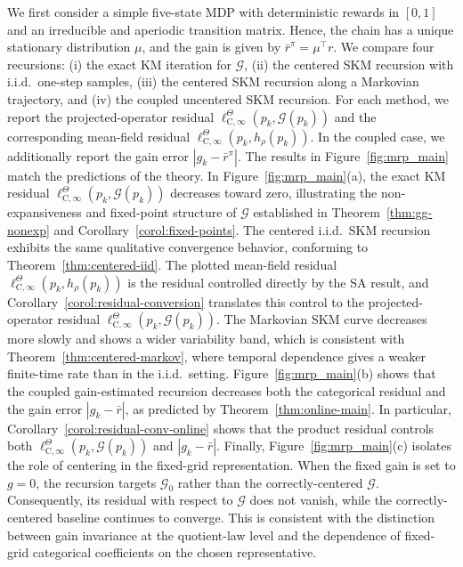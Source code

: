 \documentclass{article}
\begin{document}
We first consider a simple five-state MDP with deterministic rewards in $[0,1]$ and an irreducible and aperiodic transition matrix. Hence, the chain has a unique stationary distribution $\mu$, and the gain is given by $\bar r^\pi=\mu^\top r$. We compare four recursions: (i) the exact KM iteration for $\mathcal G$, (ii) the centered SKM recursion with i.i.d.\ one-step samples, (iii) the centered SKM recursion along a Markovian trajectory, and (iv) the coupled uncentered SKM recursion. For each method, we report the projected-operator residual $\ell^\Theta_{\mathrm C, \infty}(p_k,\mathcal G(p_k))$ and the corresponding mean-field residual $\ell^\Theta_{\mathrm C, \infty}(p_k,h_\rho(p_k))$. In the coupled case, we additionally report the gain error $|g_k-\bar r^\pi|$. The results in Figure~\ref{fig:mrp_main} match the predictions of the theory. In Figure~\ref{fig:mrp_main}(a), the exact KM residual $\ell^\Theta_{\mathrm C, \infty}(p_k,\mathcal G(p_k))$ decreases toward zero, illustrating the non-expansiveness and fixed-point structure of $\mathcal G$ established in Theorem~\ref{thm:gg-nonexp} and Corollary~\ref{corol:fixed-points}. The centered i.i.d.\ SKM recursion exhibits the same qualitative convergence behavior, conforming to Theorem~\ref{thm:centered-iid}. The plotted mean-field residual $\ell^\Theta_{\mathrm C, \infty}(p_k,h_\rho(p_k))$ is the residual controlled directly by the SA result, and Corollary~\ref{corol:residual-conversion} translates this control to the projected-operator residual $\ell^\Theta_{\mathrm C, \infty}(p_k,\mathcal G(p_k))$. The Markovian SKM curve decreases more slowly and shows a wider variability band, which is consistent with Theorem~\ref{thm:centered-markov}, where temporal dependence gives a weaker finite-time rate than in the i.i.d.\ setting. Figure~\ref{fig:mrp_main}(b) shows that the coupled gain-estimated recursion decreases both the categorical residual and the gain error $|g_k-\bar r|$, as predicted by Theorem~\ref{thm:online-main}. In particular, Corollary~\ref{corol:residual-conv-online} shows that the product residual controls both $\ell^\Theta_{\mathrm C, \infty}(p_k,\mathcal G(p_k))$ and $|g_k-\bar r|$. Finally, Figure~\ref{fig:mrp_main}(c) isolates the role of centering in the fixed-grid representation. When the fixed gain is set to $g=0$, the recursion targets $\mathcal G_0$ rather than the correctly-centered $\mathcal G$. Consequently, its residual with respect to $\mathcal G$ does not vanish, while the correctly-centered baseline continues to converge. This is consistent with the distinction between gain invariance at the quotient-law level and the dependence of fixed-grid categorical coefficients on the chosen representative.
\end{document}
